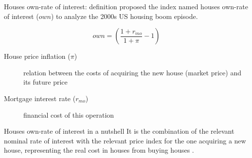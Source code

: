 \documentclass[10pt]{beamer}
\begin{document}
\begin{frame}[label={sec:org3cd8bd5}]{Houses own-rate of interest: definition}
\textcite{teixeira_crescimento_2015}  proposed the index named houses own-rate of interest (\(own\)) to analyze the 2000s US housing boom episode.

\begin{latex}
\begin{equation}
\label{txpropria}
own =  \left(\frac{1+r_{mo}}{1+\pi} - 1\right)
\end{equation}
\end{latex}

\begin{description}
\item[{House price inflation (\(\pi\))}] relation between the costs of acquiring the new house (market price) and its future price
\item[{Mortgage interest rate (\(r_{mo}\))}] financial cost of this operation
\end{description}

\begin{block}{Houses own-rate of interest in a nutshell}
It is the combination of the relevant nominal rate of interest with the relevant price index for the one acquiring a new house, representing the \alert{real cost in houses from buying houses} \parencite[p.~53]{teixeira_crescimento_2015}.
\end{block}
\end{frame}
\end{document}
